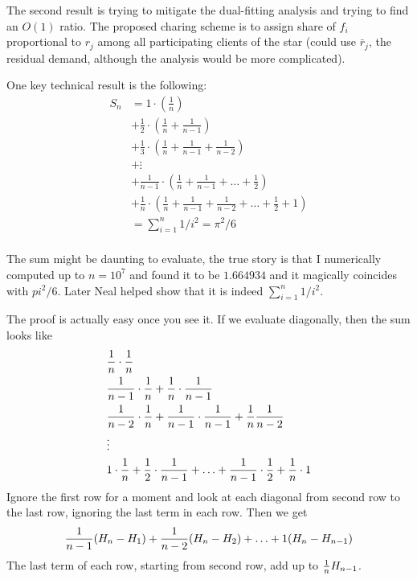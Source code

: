 \documentclass{article}
\begin{document}
The second result is trying to mitigate the dual-fitting analysis and
trying to find an $O(1)$ ratio. The proposed charing scheme is to
assign share of $f_i$ proportional to $r_j$ among all participating
clients of the star (could use $\bar r_j$, the residual demand,
although the analysis would be more complicated).

One key technical result is the following:
\begin{align*}
  S_n &=
  1\cdot \left( \frac{1}{n} \right)\\
  &+ \frac{1}{2} \cdot \left( \frac{1}{n} + \frac{1}{n-1} \right)\\
  &+ \frac{1}{3} \cdot \left( \frac{1}{n} + \frac{1}{n-1} + \frac{1}{n-2} \right)\\
  &+ \vdots\\
  &+ \frac{1}{n-1} \cdot \left( \frac{1}{n} + \frac{1}{n-1} + \ldots + \frac{1}{2} \right)\\
  &+ \frac{1}{n} \cdot \left( \frac{1}{n} + \frac{1}{n-1} + \frac{1}{n-2} + \ldots + \frac{1}{2} + 1 \right)\\
  &= \sum_{i=1}^n 1/i^2 = \pi^2/6\\
\end{align*}


The sum might be daunting to evaluate, the true story is that I
numerically computed up to $n=10^7$ and found it to be $1.664934$ and
it magically coincides with $pi^2/6$. Later Neal helped show that it
is indeed $\sum_{i=1}^n 1/i^2$.

The proof is actually easy once you see it. If we evaluate diagonally,
then the sum looks like
\begin{align*}
  &{ \frac{1}{n} }\cdot { \frac{1}{n} }\\
  &{ \frac{1}{n-1} }\cdot{ \frac{1}{n} } + { \frac{1}{n} }\cdot{ \frac{1}{n-1} }\\
  &{ \frac{1}{n-2} }\cdot{ \frac{1}{n} } + { \frac{1}{n-1} }\cdot{ \frac{1}{n-1} } +
  { \frac{1}{n} }{ \frac{1}{n-2} }\\
  &\vdots\\
  &1\cdot{ \frac{1}{n} } + { \frac{1}{2} }\cdot{ \frac{1}{n-1} } + \ldots +
  { \frac{1}{n-1} }\cdot{ \frac{1}{2} } + { \frac{1}{n} }\cdot 1\\
\end{align*}
Ignore the first row for a moment and look at each diagonal from
second row to the last row, ignoring the last term in each row. Then
we get
\begin{equation}\label{eq:nth}
  { \frac{1}{n-1} } (H_n - H_1) + { \frac{1}{n-2} } (H_n - H_2) + \ldots + 1 (H_n - H_{n-1})
\end{equation}
The last term of each row, starting from second row, add up to
${ \frac{1}{n} } H_{n-1}$.
\end{document}
